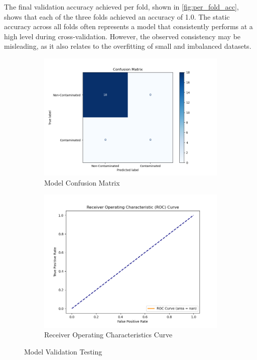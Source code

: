 \documentclass[final, 3p, 11pt]{elsarticle}
\begin{document}
The final validation accuracy achieved per fold, shown in \autoref{fig:per_fold_acc}, shows that each of the three folds achieved an accuracy of 1.0. The static accuracy across all folds often represents a model that consistently performs at a high level during cross-validation. However, the observed consistency may be misleading, as it also relates to the overfitting of small and imbalanced datasets.


\begin{figure}
        \centering
        \begin{subfigure}[b]{0.53\textwidth}
            \centering
            \includegraphics[width=\textwidth]{Images/confusion_matrix.png}  %
            \caption{Model Confusion Matrix}
            \label{fig:conf_matrix}
        \end{subfigure}
        \hfill
        \begin{subfigure}[b]{0.46\textwidth}
            \centering
            \includegraphics[width=\textwidth]{Images/roc_curve.png}  %
            \caption{Receiver Operating Characteristics Curve}
            \label{fig:roc_curve}
        \end{subfigure}
        \caption{Model Validation Testing}
        \label{fig:matrix_roc}
    \end{figure}
\end{document}
